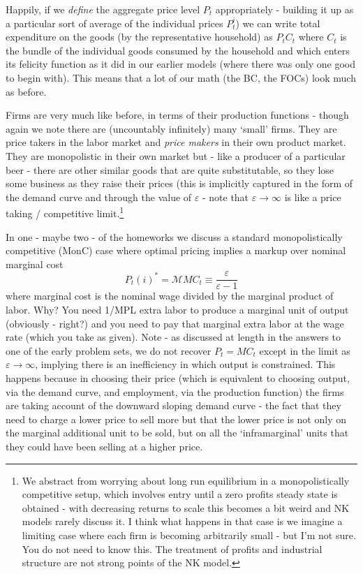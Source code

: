 \documentclass[authoryear,11pt]{elsarticle}
\begin{document}
Happily, if we \textit{define} the aggregate price level $P_{t}$ appropriately - building it up as a particular sort of average of the individual prices $P_{t}^{i}$) we can write total expenditure on the goods (by the representative household) as $P_{t} C_{t}$ where $C_{t}$ is the bundle of the individual goods consumed by the household and which enters its felicity function as it did in our earlier models (where there was only one good to begin with). This means that a lot of our math (the BC, the FOCs) look much as before.

Firms are very much like before, in terms of their production functions - though again we note there are (uncountably infinitely) many `small' firms. They are price takers in the labor market and \textit{price makers} in their own product market. They are monopolistic in their own market but - like a producer of a particular beer - there are other similar goods that are quite substitutable, so they lose some business as they raise their prices (this is implicitly captured in the form of the demand curve and through the value of $\varepsilon$ - note that $\varepsilon \rightarrow \infty$ is like a price taking / competitive limit.\footnote{We abstract from worrying about long run equilibrium in a monopolistically competitive setup, which involves entry until a zero profits steady state is obtained - with decreasing returns to scale this becomes a bit weird and NK models rarely discuss it. I think what happens in that case is we imagine a limiting case where each firm is becoming arbitrarily small - but I'm not sure. You do not need to know this. The treatment of profits and industrial structure are not strong points of the NK model.}

In one - maybe two - of the homeworks we discuss a standard monopolistically competitive (MonC) case where optimal pricing implies a markup over nominal marginal cost
\[
P_{t}(i)^{\ast} = \mathcal{M} MC_{t} \equiv \frac{\varepsilon}{\varepsilon-1}
\]
where marginal cost is the nominal wage divided by the marginal product of labor. Why? You need 1/MPL extra labor to produce a marginal unit of output (obviously - right?) and you need to pay that marginal extra labor at the wage rate (which you take as given). Note - as discussed at length in the answers to one of the early problem sets, we do not recover $P_{t}=MC_{t}$ except in the limit as $\varepsilon\rightarrow \infty$, implying there is an inefficiency in which output is constrained. This happens because in choosing their price (which is equivalent to choosing output, via the demand curve, and employment, via the production function) the firms are taking account of the downward sloping demand curve - the fact that they need to charge a lower price to sell more but that the lower price is not only on the marginal additional unit to be sold, but on all the `inframarginal' units that they could have been selling at a higher price.
\end{document}
